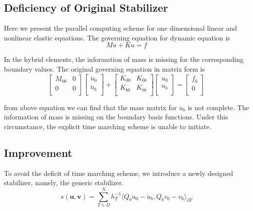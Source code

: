 \subsection{Deficiency of Original Stabilizer}

Here we present the parallel computing scheme for one dimensional linear and nonlinear elastic equations. The governing equation for dynamic equation is 
\begin{equation}
M\ddot{u} + Ku = f
\end{equation}

In the hybrid elements, the information of mass is missing for the corresponding boundary values. The original governing equation in matrix form is
\begin{equation} \label{eq:incomp}
\begin{bmatrix}
M_{00} & 0 \\0 & 0 \\
\end{bmatrix}\begin{bmatrix}
\ddot{u}_{0} \\ \ddot{u}_{b} \\
\end{bmatrix} + \begin{bmatrix}
K_{00} & K_{0b} \\ K_{b0} & K_{bb} \\
\end{bmatrix} \begin{bmatrix}
u_{0} \\ u_{b} \\
\end{bmatrix} = \begin{bmatrix}
f_{0} \\ 0 \\
\end{bmatrix}
\end{equation}

from above equation we can find that the mass matrix for $ \ddot{u}_{b} $ is not complete. The information of mass is missing on the boundary basis functions. Under this circumstance, the explicit time marching scheme is unable to initiate. 


\subsection{Improvement}
To avoid the deficit of time marching scheme, we introduce a newly designed stabilizer, namely, the generic stabilizer.
\begin{equation}
s(\mathbf{u}, \mathbf{v}) = \sum_{T \in \Omega}^{N} h_{T}^{-1} \langle Q_{b} \ddot{u}_{0} - \ddot{u}_{b}, Q_{b} v_{0} - v_{b} \rangle_{\partial T}
\end{equation}

